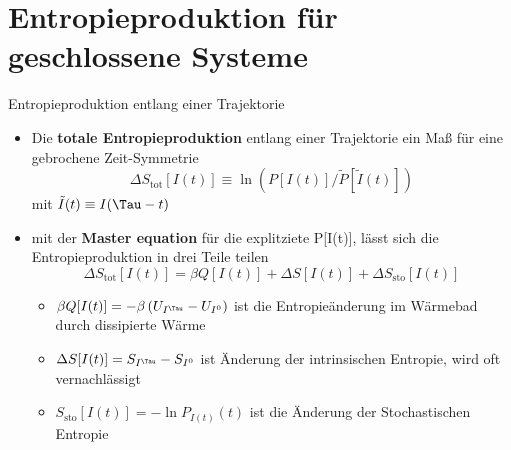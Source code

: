 \documentclass[aspectratio=1610, 9pt]{beamer}
\begin{document}
\section{Entropieproduktion für geschlossene Systeme}
\begin{frame}{Entropieproduktion entlang einer Trajektorie}
  \begin{itemize}
    \item Die \textbf{totale Entropieproduktion} entlang einer Trajektorie ein Maß für eine gebrochene Zeit-Symmetrie
    \begin{equation*}
      \Delta S_\text{tot}[I(t)] \equiv  \ln \left(P[I(t)]/ \tilde{P}[\tilde{I}(t)] \right) 
    \end{equation*}
    mit $\tilde{I}(t)  \equiv  I( \Tau -t)$ 
    \item mit der \textbf{Master equation} für die explitziete P[I(t)], lässt sich die Entropieproduktion in drei Teile teilen
    \begin{equation*}
      \Delta S_\text{tot}[I(t)] = \beta Q[I(t)] + \Delta S[I(t)] + \Delta S_\text{sto}[I(t)]
    \end{equation*}
    \begin{itemize}
      \item $\beta Q[I(t)] = -\beta \left(U_{I^\Tau}- U_{I^0} \right)$ ist die Entropieänderung im Wärmebad durch dissipierte Wärme 
      \item $\Delta S[I(t)] = S_{I^\Tau}- S_{I^0} $ ist Änderung der intrinsischen Entropie, wird oft vernachlässigt
      \item $S_\text{sto}[I(t)]= - \ln P_{I(t)}(t)$ ist die Änderung der Stochastischen Entropie
    \end{itemize}
  \end{itemize}
\end{frame}
\end{document}
